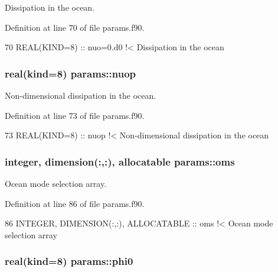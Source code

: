 Dissipation in the ocean. 



Definition at line 70 of file params.\+f90.


\begin{DoxyCode}
70   \textcolor{keywordtype}{REAL(KIND=8)} :: nuo=0.d0  \textcolor{comment}{!< Dissipation in the ocean}
\end{DoxyCode}
\subsubsection[{\texorpdfstring{nuop}{nuop}}]{\setlength{\rightskip}{0pt plus 5cm}real(kind=8) params\+::nuop}\hypertarget{namespaceparams_a4802663c55680d2c51142f63636abd2e}{}\label{namespaceparams_a4802663c55680d2c51142f63636abd2e}


Non-\/dimensional dissipation in the ocean. 



Definition at line 73 of file params.\+f90.


\begin{DoxyCode}
73   \textcolor{keywordtype}{REAL(KIND=8)} :: nuop\textcolor{comment}{      !< Non-dimensional dissipation in the ocean}
\end{DoxyCode}
\subsubsection[{\texorpdfstring{oms}{oms}}]{\setlength{\rightskip}{0pt plus 5cm}integer, dimension(\+:,\+:), allocatable params\+::oms}\hypertarget{namespaceparams_a5e25e072992d5908eea5308243b7ec63}{}\label{namespaceparams_a5e25e072992d5908eea5308243b7ec63}


Ocean mode selection array. 



Definition at line 86 of file params.\+f90.


\begin{DoxyCode}
86   \textcolor{keywordtype}{INTEGER}, \textcolor{keywordtype}{DIMENSION(:,:)}, \textcolor{keywordtype}{ALLOCATABLE} :: oms\textcolor{comment}{   !< Ocean mode selection array}
\end{DoxyCode}
\subsubsection[{\texorpdfstring{phi0}{phi0}}]{\setlength{\rightskip}{0pt plus 5cm}real(kind=8) params\+::phi0}\hypertarget{namespaceparams_a7e58166ca3fb2153f781aa623c5c31e6}{}\label{namespaceparams_a7e58166ca3fb2153f781aa623c5c31e6}


